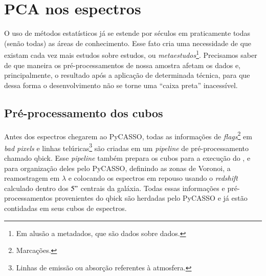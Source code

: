 



\chapter{PCA nos espectros}
\label{sec:UsoPCA}

O uso de métodos estatísticos já se estende por séculos em praticamente todas (senão todas) as áreas de conhecimento.
Esse fato cria uma necessidade de que existam cada vez mais estudos sobre estudos, ou {\em metaestudos}\footnote{Em
alusão a metadados, que são dados sobre dados.}. Precisamos saber de que maneira os pré-processamentos de nossa amostra
afetam os dados e, principalmente, o resultado após a aplicação de determinada técnica, para que dessa forma o
desenvolvimento não se torne uma ``caixa preta'' inacessível.

\section{Pré-processamento dos cubos}
\label{sec:UsoPCA:PCAlidades}

Antes dos espectros chegarem ao PyCASSO, todas as informações de {\em flags}\footnote{Marcações.} em {\em bad pixels} e
linhas telúricas\footnote{Linhas de emissão ou absorção referentes à atmosfera.} são criadas em um {\em pipeline} de
pré-processamento chamado {\sc qbick}. Esse {\em pipeline} também prepara os cubos para a execução do \starlight, e para
organização deles pelo PyCASSO, definindo as zonas de Voronoi, a reamostragem em $\lambda$ e colocando os espectros em
repouso usando o {\em redshift} calculado dentro dos $5"$ centrais da galáxia. Todas essas informações e
pré-processamentos provenientes do {\sc qbick} são herdadas pelo PyCASSO e já estão contidadas em seus cubos de
espectros.

